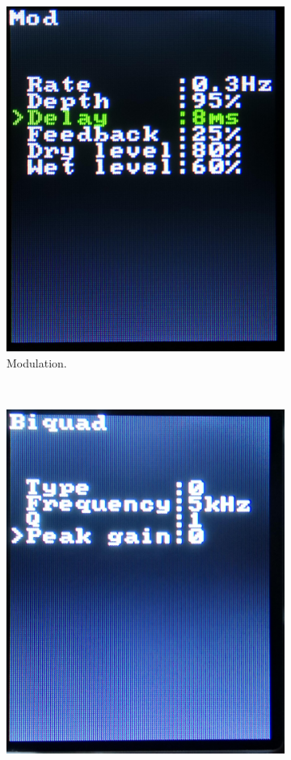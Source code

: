\documentclass[a4paper,twoside,12pt]{book}
\begin{document}
\begin{figure}[H]
\begin{subfigure}[t]{0.23\textwidth}
        \includegraphics[width=\textwidth]{images/screen2}
        \caption{Modulation.}
    \end{subfigure}
    ~
    \begin{subfigure}[t]{0.23\textwidth}
        \includegraphics[width=\textwidth]{images/screen3}

\end{subfigure}
\end{figure}
\end{document}
